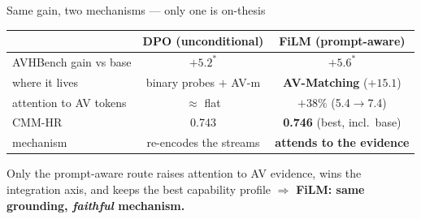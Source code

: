 \documentclass[aspectratio=169,11pt]{beamer}
\begin{document}
\begin{frame}{Same gain, two mechanisms --- only one is on-thesis}
\centering\small
\renewcommand{\arraystretch}{1.35}
\begin{tabular}{l c c}
\toprule
 & \textbf{DPO (unconditional)} & \textbf{FiLM (prompt-aware)} \\
\midrule
AVHBench gain vs base   & $+5.2^{*}$ & $\mathbf{+5.6^{*}}$ \\
where it lives          & binary probes $+$ AV-m & \textbf{AV-Matching} ($+15.1$) \\
attention to AV tokens  & $\approx$ flat & \textbf{$+38\%$} (5.4$\to$7.4) \\
CMM-HR                  & 0.743 & \textbf{0.746} (best, incl.\ base) \\
mechanism               & re-encodes the streams & \textbf{attends to the evidence} \\
\bottomrule
\end{tabular}

\vfill

\begin{center}
\begin{block}{}
\centering\small Only the prompt-aware route raises attention to AV evidence, wins the integration
axis, and keeps the best capability profile $\Rightarrow$ \textbf{FiLM: same grounding, \emph{faithful} mechanism.}
\end{block}
\end{center}
\end{frame}
\end{document}
